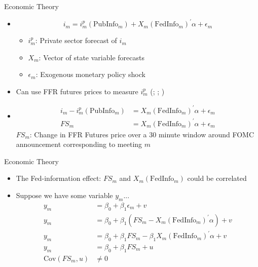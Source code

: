 \documentclass[xcolor=dvipsnames, compress, t]{beamer}
\begin{document}
	\begin{frame}{Economic Theory}
		\begin{itemize}
			\item<2-> \[
			i_m = i_m^p(\text{PubInfo}_m) + X_m(\text{FedInfo}_m)^\prime \alpha + \epsilon_m 
			\]
			\begin{itemize}
				\item<2-> \(i_m^p\): Private sector forecast of \(i_m\)
				\item<2->\(X_m\): Vector of state variable forecasts
				\item<2-> \(\epsilon_m\): Exogenous monetary policy shock
			\end{itemize}
			\item<3-> Can use FFR futures prices to measure \(i_m^p\) (\cite{Gurkaynak2011}; \cite{Gertler2015}; \cite{Nakamura2018})
			\item<4-> 
				\begin{align*}
					i_m - i_m^p(\text{PubInfo}_m) &= X_m(\text{FedInfo}_m)^\prime \alpha + \epsilon_m \\
					FS_m &= X_m(\text{FedInfo}_m)^\prime \alpha + \epsilon_m 
				\end{align*}
			\(FS_m\): Change in FFR Futures price over a 30 minute window around FOMC announcement corresponding to meeting \(m\)
		\end{itemize}
	\end{frame}
	\begin{frame}{Economic Theory}
		\begin{itemize}
			\item<2-> The Fed-information effect: \(FS_m\) and \(X_m(\text{FedInfo}_m)\) could be correlated
			\item<3-> Suppose we have some variable \(y_m\)...
			\begin{align*}				
				y_m &= \beta_0 + \beta_1 \epsilon_m  + v \\
				y_m &= \beta_0 + \beta_1(FS_m - X_m(\text{FedInfo}_m)^\prime \alpha )  + v \\
				y_m &= \beta_0 + \beta_1FS_m - \beta_1 X_m(\text{FedInfo}_m)^\prime \alpha + v \\
				y_m &= \beta_0 + \beta_1FS_m + u \tag{4} \label{eq3} \\ 
				\mathrm{Cov}(FS_m, u) &\neq 0 
			\end{align*}
		\end{itemize}
	\end{frame}
\end{document}
